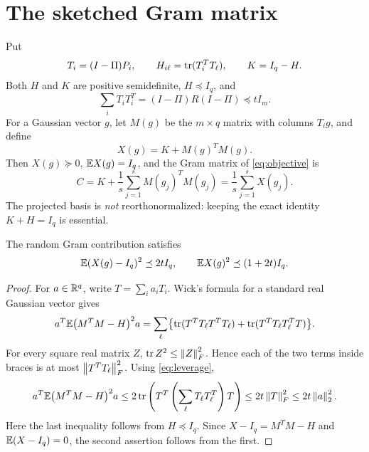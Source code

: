 \documentclass[11pt]{article}
\begin{document}
\section{The sketched Gram matrix}
Put
\[
 T_i=(I-\Pi)P_i,\qquad
 H_{i\ell}=\operatorname{tr}(T_i^TT_\ell),\qquad K=I_q-H.
\]
Both $H$ and $K$ are positive semidefinite, $H\preceq I_q$, and
\begin{equation}\label{eq:leverage}
 \sum_iT_iT_i^T=(I-\Pi)R(I-\Pi)\preceq tI_m.
\end{equation}
For a Gaussian vector $g$, let $M(g)$ be the $m\times q$ matrix with columns $T_i g$, and define
\[
 X(g)=K+M(g)^TM(g).
\]
Then $X(g)\succeq0$, $\mathbb E X(g)=I_q$, and the Gram matrix of \eqref{eq:objective} is
\[
 C=K+\frac1s\sum_{j=1}^sM(g_j)^TM(g_j)
   =\frac1s\sum_{j=1}^sX(g_j).
\]
The projected basis is \emph{not} reorthonormalized: keeping the exact identity $K+H=I_q$ is essential.

\begin{lemma}\label{lem:moment}
The random Gram contribution satisfies
\[
 \mathbb E(X(g)-I_q)^2\preceq2tI_q,
 \qquad \mathbb E X(g)^2\preceq(1+2t)I_q.
\]
\end{lemma}
\begin{proof}
For $a\in\mathbb R^q$, write $T=\sum_i a_iT_i$. Wick's formula for a standard real Gaussian vector gives
\begin{align*}
 a^T\mathbb E\bigl(M^TM-H\bigr)^2a
 =\sum_\ell\bigl\{
   \operatorname{tr}(T^TT_\ell T^TT_\ell)
   +\operatorname{tr}(T^TT_\ell T_\ell^TT)\bigr\}.
\end{align*}
For every square real matrix $Z$, $\operatorname{tr} Z^2\le\left\lVert Z\right\rVert_F^2$. Hence each of the two terms inside braces is at most $\left\lVert T^TT_\ell\right\rVert_F^2$. Using \eqref{eq:leverage},
\[
 a^T\mathbb E\bigl(M^TM-H\bigr)^2a
 \le2\operatorname{tr}\left(T^T\left(\sum_\ell T_\ell T_\ell^T\right)T\right)
 \le2t\left\lVert T\right\rVert_F^2\le2t\left\lVert a\right\rVert_2^2.
\]
Here the last inequality follows from $H\preceq I_q$. Since $X-I_q=M^TM-H$ and $\mathbb E(X-I_q)=0$, the second assertion follows from the first.
\end{proof}
\end{document}
